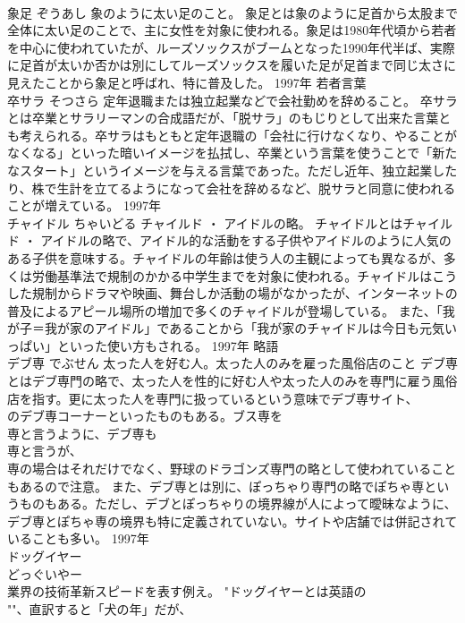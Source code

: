 \documentclass[8pt]{extreport}
\begin{document}
\begin{CJK}{UTF8}{min}
\\	象足	ぞうあし	象のように太い足のこと。	象足とは象のように足首から太股まで全体に太い足のことで、主に女性を対象に使われる。象足は1980年代頃から若者を中心に使われていたが、ルーズソックスがブームとなった1990年代半ば、実際に足首が太いか否かは別にしてルーズソックスを履いた足が足首まで同じ太さに見えたことから象足と呼ばれ、特に普及した。	1997年	若者言葉	
\\	卒サラ	そつさら	定年退職または独立起業などで会社勤めを辞めること。	卒サラとは卒業とサラリーマンの合成語だが、「脱サラ」のもじりとして出来た言葉とも考えられる。卒サラはもともと定年退職の「会社に行けなくなり、やることがなくなる」といった暗いイメージを払拭し、卒業という言葉を使うことで「新たなスタート」というイメージを与える言葉であった。ただし近年、独立起業したり、株で生計を立てるようになって会社を辞めるなど、脱サラと同意に使われることが増えている。	1997年	
\\	チャイドル	ちゃいどる	チャイルド ・ アイドルの略。	チャイドルとはチャイルド ・ アイドルの略で、アイドル的な活動をする子供やアイドルのように人気のある子供を意味する。チャイドルの年齢は使う人の主観によっても異なるが、多くは労働基準法で規制のかかる中学生までを対象に使われる。チャイドルはこうした規制からドラマや映画、舞台しか活動の場がなかったが、インターネットの普及によるアピール場所の増加で多くのチャイドルが登場している。 また、「我が子＝我が家のアイドル」であることから「我が家のチャイドルは今日も元気いっぱい」といった使い方もされる。	1997年	略語	
\\	デブ専	でぶせん	太った人を好む人。太った人のみを雇った風俗店のこと	デブ専とはデブ専門の略で、太った人を性的に好む人や太った人のみを専門に雇う風俗店を指す。更に太った人を専門に扱っているという意味でデブ専サイト、
\\	のデブ専コーナーといったものもある。ブス専を
\\	専と言うように、デブ専も
\\	専と言うが、
\\	専の場合はそれだけでなく、野球のドラゴンズ専門の略として使われていることもあるので注意。 また、デブ専とは別に、ぽっちゃり専門の略でぽちゃ専というものもある。ただし、デブとぽっちゃりの境界線が人によって曖昧なように、デブ専とぽちゃ専の境界も特に定義されていない。サイトや店舗では併記されていることも多い。	1997年	
\\	ドッグイヤー 
\\	どっぐいやー	
\\	業界の技術革新スピードを表す例え。	"ドッグイヤーとは英語の
\\	""、直訳すると「犬の年」だが、

\end{CJK}
\end{document}
